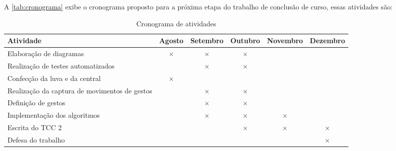 \label{chapter:cronograma}

A \autoref{tab:cronograma} exibe o cronograma proposto para a próxima etapa do trabalho de conclusão de curso, essas atividades são:

\begin{table}[htbp]
  \centering
  \caption{Cronograma de atividades}
  \label{tab:cronograma}
  \begin{tabularx}{\textwidth}{|X|c|c|c|c|c|}
    \hline
    \textbf{Atividade} & \textbf{Agosto} & \textbf{Setembro} & \textbf{Outubro} & \textbf{Novembro} & \textbf{Dezembro} \\
    \hline
    Elaboração de diagramas & \(\times\) & \(\times\) & \(\times\) & & \\
    \hline
    Realização de testes automatizados &  & \(\times\) &  \(\times\) & & \\
    \hline
    Confecção da luva e da central & \(\times\) & & & & \\
    \hline
    Realização da captura de movimentos de gestos & & \(\times\) & \(\times\) & &  \\
    \hline
    Definição de gestos & & \(\times\) & \(\times\)  & &  \\
    \hline
    Implementação dos algoritmos & & \(\times\) & \(\times\)  & \(\times\) & \\
    \hline
    Escrita do TCC 2 & & & \(\times\)  & \(\times\) & \(\times\)\\
    \hline
    Defesa do trabalho & & & &  & \(\times\) \\
    \hline
  \end{tabularx}
\end{table}